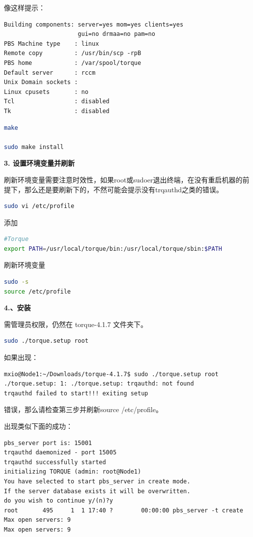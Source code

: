 {像这样提示：
\begin{verbatim}
Building components: server=yes mom=yes clients=yes
                     gui=no drmaa=no pam=no
PBS Machine type    : linux
Remote copy         : /usr/bin/scp -rpB
PBS home            : /var/spool/torque
Default server      : rccm
Unix Domain sockets :
Linux cpusets       : no
Tcl                 : disabled
Tk                  : disabled
\end{verbatim}

\begin{lstlisting}[language=sh]
make

sudo make install
\end{lstlisting}

\textbf{3. 设置环境变量并刷新}

刷新环境变量需要注意时效性，如果root或sudoer退出终端，在没有重启机器的前提下，那么还是要刷新下的，不然可能会提示没有trqauthd之类的错误。
\begin{lstlisting}[language=sh]
sudo vi /etc/profile
\end{lstlisting}
添加
\begin{lstlisting}[language=sh]
#Torque
export PATH=/usr/local/torque/bin:/usr/local/torque/sbin:$PATH
\end{lstlisting}
刷新环境变量
\begin{lstlisting}[language=sh]
sudo -s
source /etc/profile
\end{lstlisting}

\textbf{4.、安装}

需管理员权限，仍然在 torque-4.1.7 文件夹下。
\begin{lstlisting}[language=sh]
sudo ./torque.setup root
\end{lstlisting}
如果出现：
\begin{verbatim}
mxio@Node1:~/Downloads/torque-4.1.7$ sudo ./torque.setup root
./torque.setup: 1: ./torque.setup: trqauthd: not found
trqauthd failed to start!!! exiting setup 
\end{verbatim}
错误，那么请检查第三步并刷新source /etc/profile。

出现类似下面的成功：
\begin{verbatim}
pbs_server port is: 15001
trqauthd daemonized - port 15005
trqauthd successfully started
initializing TORQUE (admin: root@Node1)
You have selected to start pbs_server in create mode.
If the server database exists it will be overwritten.
do you wish to continue y/(n)?y
root       495     1  1 17:40 ?        00:00:00 pbs_server -t create
Max open servers: 9
Max open servers: 9
\end{verbatim}


}
